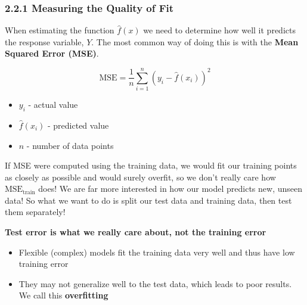 \subsubsection*{2.2.1 Measuring the Quality of Fit}\label{measuring-the-quality-of-fit}

When estimating the function \(\hat f (x)\) we need to determine how well it predicts the response variable, \(Y\).
The most common way of doing this is with the \textbf{Mean Squared Error (MSE)}.

\begin{equation*}
    \text{MSE} = \frac{1}{n}\sum_{i=1}^{n}\left(y_i - \hat f(x_i) \right)^2
\end{equation*}
\begin{itemize}
    \tightlist
    \item \(y_i\) - actual value
    \item  \(\hat{f}(x_i)\) - predicted value
    \item \(n\) - number of data points
\end{itemize}

If MSE were computed using the training data, we would fit our training points as closely as possible and would surely overfit, so we don't really care how \(\text{MSE}_{\text{train}}\) does! We are far more interested in how our model predicts new, unseen data! So what we want to do is split our test data and training data, then test them separately!

\textbf{Test error is what we really care about, not the training error}

\begin{itemize}
\tightlist
\item  Flexible (complex) models fit the training data very well and thus have low training error
\item  They may not generalize well to the test data, which leads to poor results. We call this \textbf{overfitting}
\end{itemize}
